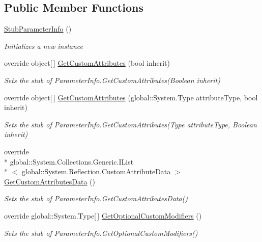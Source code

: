 \subsection*{Public Member Functions}
\begin{DoxyCompactItemize}
\item 
\hyperlink{class_system_1_1_reflection_1_1_fakes_1_1_stub_parameter_info_a7f7b54a35dcc2d2f6fe4c3e7db6ed78a}{Stub\-Parameter\-Info} ()
\begin{DoxyCompactList}\small\item\em Initializes a new instance\end{DoxyCompactList}\item 
override object\mbox{[}$\,$\mbox{]} \hyperlink{class_system_1_1_reflection_1_1_fakes_1_1_stub_parameter_info_a1ef78fbd45ef886f9178b4a9d5172c59}{Get\-Custom\-Attributes} (bool inherit)
\begin{DoxyCompactList}\small\item\em Sets the stub of Parameter\-Info.\-Get\-Custom\-Attributes(\-Boolean inherit)\end{DoxyCompactList}\item 
override object\mbox{[}$\,$\mbox{]} \hyperlink{class_system_1_1_reflection_1_1_fakes_1_1_stub_parameter_info_a6d48b16c931adf973c18a90522afd8a5}{Get\-Custom\-Attributes} (global\-::\-System.\-Type attribute\-Type, bool inherit)
\begin{DoxyCompactList}\small\item\em Sets the stub of Parameter\-Info.\-Get\-Custom\-Attributes(\-Type attribute\-Type, Boolean inherit)\end{DoxyCompactList}\item 
override \\*
global\-::\-System.\-Collections.\-Generic.\-I\-List\\*
$<$ global\-::\-System.\-Reflection.\-Custom\-Attribute\-Data $>$ \hyperlink{class_system_1_1_reflection_1_1_fakes_1_1_stub_parameter_info_a02677b8dc1ad1a04960c1639f7ad2328}{Get\-Custom\-Attributes\-Data} ()
\begin{DoxyCompactList}\small\item\em Sets the stub of Parameter\-Info.\-Get\-Custom\-Attributes\-Data()\end{DoxyCompactList}\item 
override global\-::\-System.\-Type\mbox{[}$\,$\mbox{]} \hyperlink{class_system_1_1_reflection_1_1_fakes_1_1_stub_parameter_info_a842b0b8793b2418bf5f4f771af7c6626}{Get\-Optional\-Custom\-Modifiers} ()
\begin{DoxyCompactList}\small\item\em Sets the stub of Parameter\-Info.\-Get\-Optional\-Custom\-Modifiers()\end{DoxyCompactList}\item 

\end{DoxyCompactItemize}
